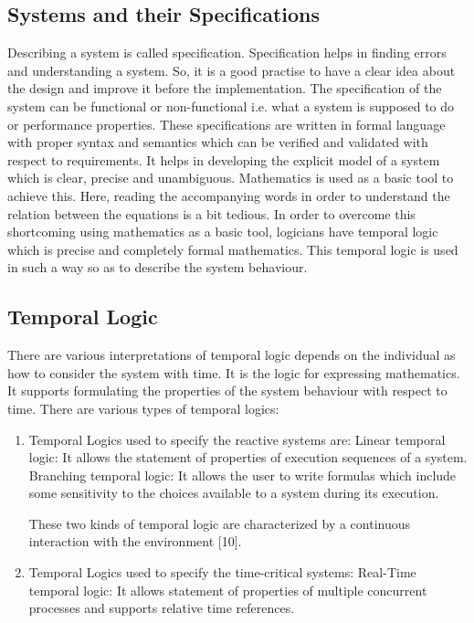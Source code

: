 \documentclass{article}
\begin{document}
\subsection{Systems and their Specifications}
Describing a system is called specification. Specification helps in finding errors and    understanding a system. So, it is a good practise to have a clear idea about the design and improve it before the implementation. The specification of the system can be functional or non-functional i.e. what a system is supposed to do or performance properties. These specifications are written in formal language with proper syntax and semantics which can be verified and validated with respect to requirements. 
It helps in developing the explicit model of a system which is clear, precise and unambiguous. Mathematics is used as a basic tool to achieve this. Here, reading the accompanying words in order to understand the relation between the equations is a bit tedious. In order to overcome this shortcoming using mathematics as a basic tool, logicians have temporal logic which is precise and completely formal mathematics. This temporal logic is used in such a way so as to describe the system behaviour.  
\subsection{Temporal Logic}
There are various interpretations of temporal logic depends on the individual as how to consider the system with time. It is the logic for expressing mathematics. It supports formulating the properties of the system behaviour with respect to time. \newline There are various types of temporal logics: \newline



\begin{enumerate}
\item Temporal Logics used to specify the reactive systems are: \newline
 Linear temporal logic:  It allows the statement of properties of execution sequences of a system. \newline
 Branching temporal logic: It allows the user to write formulas which include some sensitivity to the choices available to a system during its execution.\newline
 
These two kinds of temporal logic are characterized by a continuous interaction with the environment [10].\newline
\item	Temporal Logics used to specify the time-critical systems: \newline
Real-Time temporal logic: It allows statement of properties of multiple concurrent processes and supports relative time references.\newline
\end{enumerate}
\end{document}
